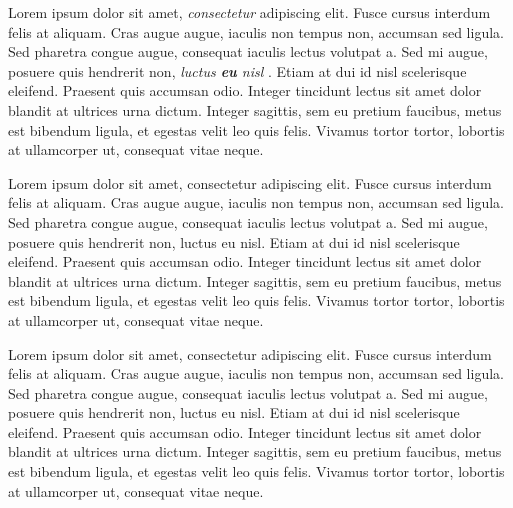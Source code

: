 \documentclass[a4paper,11pt]{report}
\begin{document}
Lorem ipsum dolor sit amet, \emph{consectetur} adipiscing elit. Fusce cursus interdum felis at aliquam. Cras augue augue, iaculis non tempus non, accumsan sed ligula. Sed pharetra congue augue, consequat iaculis lectus volutpat a. Sed mi augue, posuere quis hendrerit non, \emph{luctus \textbf{eu} nisl} . Etiam at dui id nisl scelerisque eleifend. Praesent quis accumsan odio. Integer tincidunt lectus sit amet dolor blandit at ultrices urna dictum. Integer sagittis, sem eu pretium faucibus, metus est bibendum ligula, et egestas velit leo quis felis. Vivamus tortor tortor, lobortis at ullamcorper ut, consequat vitae neque.

Lorem ipsum dolor sit amet, consectetur adipiscing elit. Fusce cursus interdum felis at aliquam. Cras augue augue, iaculis non tempus non, accumsan sed ligula. Sed pharetra congue augue, consequat iaculis lectus volutpat a. Sed mi augue, posuere quis hendrerit non, luctus eu nisl. Etiam at dui id nisl scelerisque eleifend. Praesent quis accumsan odio. Integer tincidunt lectus sit amet dolor blandit at ultrices urna dictum. Integer sagittis, sem eu pretium faucibus, metus est bibendum ligula, et egestas velit leo quis felis. Vivamus tortor tortor, lobortis at ullamcorper ut, consequat vitae neque. 

Lorem ipsum dolor sit amet, consectetur adipiscing elit. Fusce cursus interdum felis at aliquam. Cras augue augue, iaculis non tempus non, accumsan sed ligula. Sed pharetra congue augue, consequat iaculis lectus volutpat a. Sed mi augue, posuere quis hendrerit non, luctus eu nisl. Etiam at dui id nisl scelerisque eleifend. Praesent quis accumsan odio. Integer tincidunt lectus sit amet dolor blandit at ultrices urna dictum. Integer sagittis, sem eu pretium faucibus, metus est bibendum ligula, et egestas velit leo quis felis. Vivamus tortor tortor, lobortis at ullamcorper ut, consequat vitae neque. 
\end{document}
